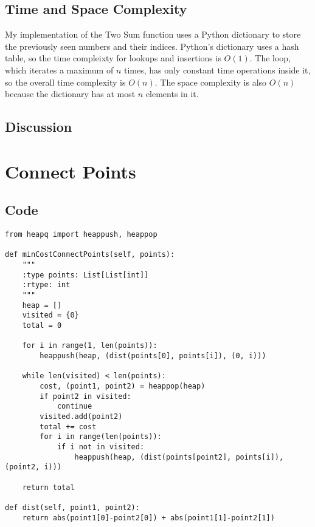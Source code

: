 \documentclass[12pt]{article}
\begin{document}
\subsection{Time and Space Complexity}
My implementation of the Two Sum function uses a Python dictionary to store the
previously seen numbers and their indices. Python's dictionary uses a hash table,
so the time compleixty for lookups and insertions is \( O(1) \). The loop, which
iterates a maximum of \( n \) times, has only constant time operations inside it,
so the overall time complexity is \( O(n) \). The space complexity is also \( O(n) \)
because the dictionary has at most \( n \) elements in it.

\subsection{Discussion}

\newpage
\section{Connect Points}
\subsection{Code}
\lstset{
    caption=Connect Points,
}
\begin{lstlisting}
from heapq import heappush, heappop

def minCostConnectPoints(self, points):
    """
    :type points: List[List[int]]
    :rtype: int
    """
    heap = []
    visited = {0}
    total = 0

    for i in range(1, len(points)):
        heappush(heap, (dist(points[0], points[i]), (0, i)))

    while len(visited) < len(points):
        cost, (point1, point2) = heappop(heap)
        if point2 in visited:
            continue
        visited.add(point2)
        total += cost
        for i in range(len(points)):
            if i not in visited:
                heappush(heap, (dist(points[point2], points[i]), (point2, i)))

    return total

def dist(self, point1, point2):
    return abs(point1[0]-point2[0]) + abs(point1[1]-point2[1])
\end{lstlisting}
\end{document}
